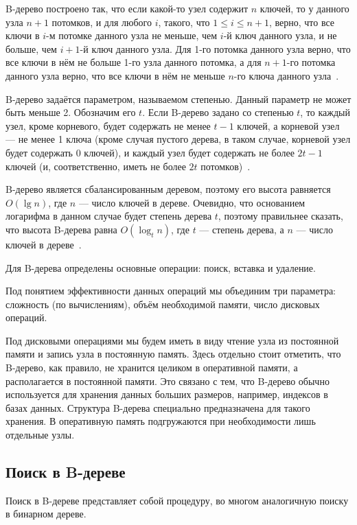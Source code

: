 \documentclass[a4paper,12pt]{article}
\begin{document}
	B-дерево построено так, что если какой-то узел содержит $n$ ключей, то у данного узла $n+1$ потомков, и для любого $i$, такого, что $1\le i\le n+1$, верно, что все ключи в $i$-м потомке данного узла не меньше, чем $i$-й ключ данного узла, и не больше, чем $i+1$-й ключ данного узла. Для 1-го потомка данного узла верно, что все ключи в нём не больше 1-го узла данного потомка, а для $n+1$-го потомка данного узла верно, что все ключи в нём не меньше $n$-го ключа данного узла~\cite{Kormen}.
	
	B-дерево задаётся параметром, называемом степенью. Данный параметр не может быть меньше 2. Обозначим его $t$. Если B-дерево задано со степенью $t$, то каждый узел, кроме корневого, будет содержать не менее $t-1$ ключей, а корневой узел --- не менее 1 ключа (кроме случая пустого дерева, в таком случае, корневой узел будет содержать 0 ключей), и каждый узел будет содержать не более $2t-1$ ключей (и, соответственно, иметь не более $2t$ потомков)~\cite{Kormen}.
	
	B-дерево является сбалансированным деревом, поэтому его высота равняется $O(\lg n)$, где $n$ --- число ключей в дереве. Очевидно, что основанием логарифма в данном случае будет степень дерева $t$, поэтому правильнее сказать, что высота B-дерева равна $O(\log_t n)$, где $t$ --- степень дерева, а $n$ --- число ключей в дереве~\cite{Kormen}.
	
	Для B-дерева определены основные операции: поиск, вставка и удаление.
	
	Под понятием эффективности данных операций мы объединим три параметра: сложность (по вычислениям), объём необходимой памяти, число дисковых операций.
	
	Под дисковыми операциями мы будем иметь в виду чтение узла из постоянной памяти и запись узла в постоянную память. Здесь отдельно стоит отметить, что B-дерево, как правило, не хранится целиком в оперативной памяти, а располагается в постоянной памяти. Это связано с тем, что B-дерево обычно используется для хранения данных больших размеров, например, индексов в базах данных. Структура B-дерева специально предназначена для такого хранения. В оперативную память подгружаются при необходимости лишь отдельные узлы.
	
	\subsection{Поиск в B-дереве}
	
	Поиск в B-дереве представляет собой процедуру, во многом аналогичную поиску в бинарном дереве.
	
\end{document}
